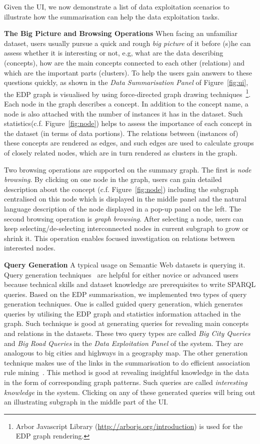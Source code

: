 Given the UI, we now demonstrate a list of data exploitation scenarios to illustrate how the summarisation can help the data exploitation tasks.

\noindent \textbf{The Big Picture and Browsing Operations}
When facing an unfamiliar dataset, users usually pursue a quick and rough \emph{big picture} of it before (s)he can assess whether it is interesting or not, e.g, what are the data describing (concepts), how are the main concepts connected to each other (relations) and which are the important parts (clusters). To help the users gain answers to these questions quickly, as shown in the \emph{Data Summarisation Panel} of Figure~\ref{fig:ui}, the EDP graph is visualised by using force-directed graph drawing techniques~\footnote{Arbor Javascript Library (\url{http://arborjs.org/introduction}) is used for the EDP graph rendering.}. Each node in the graph describes a concept. In addition to the concept name, a node is also attached with the number of instances it has in the dataset. Such statistics(c.f. Figure~\ref{fig:node}) helps to assess the importance of each concept in the dataset (in terms of data portions). The relations between (instances of) these concepts are rendered as edges, and such edges are used to calculate groups of closely related nodes, which are in turn rendered as clusters in the graph.

Two browsing operations are supported on the summary graph. The first is \emph{node browsing}. By clicking on one node in the graph, users can gain detailed description about the concept (c.f. Figure~\ref{fig:node}) including the subgraph centralised on this node which is displayed in the middle panel and the natural language description of the node displayed in a pop-up panel on the left. The second browsing operation is \emph{graph browsing}. After selecting a node, users can keep selecting/de-selecting interconnected nodes in current subgraph to grow or shrink it. This operation enables focused investigation on relations between interested nodes.

\noindent \textbf{Query Generation}
A typical usage on Semantic Web datasets is querying it. Query generation techniques~\cite{pan2013query} are helpful for either novice or advanced users because technical skills and dataset knowledge are prerequisites to write SPARQL queries. Based on the EDP summarisation, we implemented two types of query generation techniques. One is called guided query generation, which generates queries by utilising the EDP graph and statistics information attached in the graph. Such technique is good at generating queries for revealing main concepts and relations in the datasets. These two query types are called \emph{Big City Queries} and \emph{Big Road Queries} in the \emph{Data Exploitation Panel} of the system. They are analogous to big cities and highways in a geography map. The other generation technique makes use of the links in the summarisation to do efficient association rule mining~\cite{pan2013query}. This method is good at revealing insightful knowledge in the data in the form of corresponding graph patterns. Such queries are called \emph{interesting knowledge} in the system. Clicking on any of these generated queries will bring out an illustrating subgraph in the middle part of the UI.  


